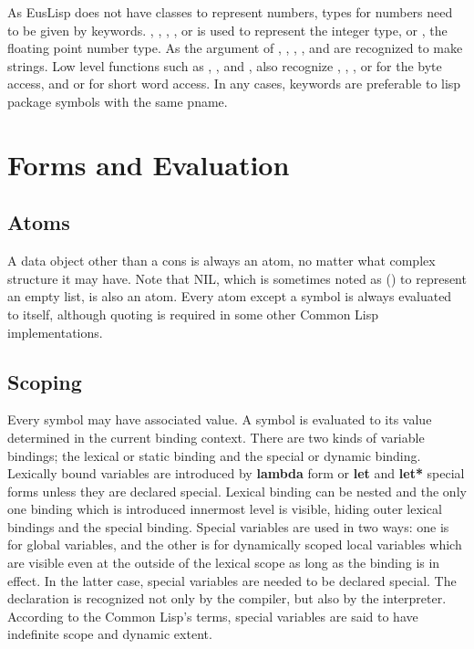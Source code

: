 As EusLisp does not have classes to represent numbers,
types for numbers need to be given by keywords.
, , , ,
or  is used to represent the integer type,
 or , the floating point number type.
As the  argument of ,
, , , and 
are recognized to make strings.
Low level functions such as , ,
and , also recognize
, , , or 
for the byte access, and  or  for short word access.
In any cases, keywords are preferable to lisp package symbols with the
same pname.

\newpage

\section{Forms and Evaluation}
\subsection{Atoms}

A data object other than a cons is always an atom, no matter what complex
structure it may have.
Note that NIL, which is sometimes noted as () to represent an empty
list, is also an atom.
Every atom except a symbol is always evaluated to itself,
although quoting is required in some other Common Lisp implementations.

\subsection{Scoping}

Every symbol may have associated value.
A symbol is evaluated to its value determined in the current binding context.
There are two kinds of variable bindings;
the lexical or static binding and the special or dynamic binding.
Lexically bound variables are introduced by {\bf lambda} form or
{\bf let} and {\bf let*} special forms
unless they are declared special.
Lexical binding can be nested and the only one binding which is introduced
innermost level is visible, hiding outer lexical bindings and the special 
binding.
Special variables are used in two ways:
one is for global variables, and the other is for dynamically scoped
local variables which are visible even at the outside of
the lexical scope as long as the binding is in effect.
In the latter case, special variables are needed to be declared special.
The declaration is recognized not only by the compiler, but also by
the interpreter.
According to the Common Lisp's terms, special variables are said to have
indefinite scope and dynamic extent.


